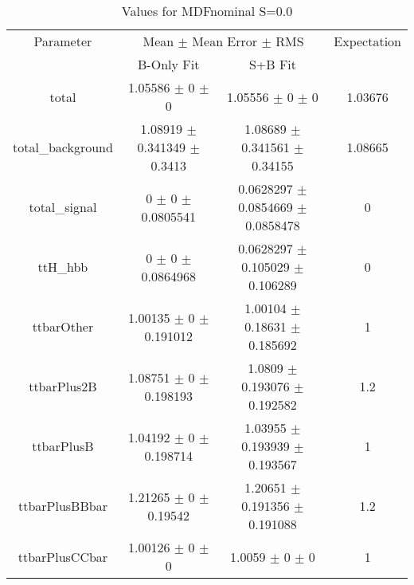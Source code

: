 \begin{table}
\centering
\caption{Values for MDFnominal S=0.0}
\begin{tabular}{cccc}
\toprule
Parameter & \multicolumn{2}{c}{Mean $\pm$ Mean Error $\pm$ RMS} & Expectation\\
 & B-Only Fit & S+B Fit & \\
\midrule
total & \num{1.05586} $\pm$ \num{0} $\pm$ \num{0} & \num{1.05556} $\pm$ \num{0} $\pm$ \num{0} & \num{1.03676}\\
total\_background & \num{1.08919} $\pm$ \num{0.341349} $\pm$ \num{0.3413} & \num{1.08689} $\pm$ \num{0.341561} $\pm$ \num{0.34155} & \num{1.08665}\\
total\_signal & \num{0} $\pm$ \num{0} $\pm$ \num{0.0805541} & \num{0.0628297} $\pm$ \num{0.0854669} $\pm$ \num{0.0858478} & \num{0}\\
ttH\_hbb & \num{0} $\pm$ \num{0} $\pm$ \num{0.0864968} & \num{0.0628297} $\pm$ \num{0.105029} $\pm$ \num{0.106289} & \num{0}\\
ttbarOther & \num{1.00135} $\pm$ \num{0} $\pm$ \num{0.191012} & \num{1.00104} $\pm$ \num{0.18631} $\pm$ \num{0.185692} & \num{1}\\
ttbarPlus2B & \num{1.08751} $\pm$ \num{0} $\pm$ \num{0.198193} & \num{1.0809} $\pm$ \num{0.193076} $\pm$ \num{0.192582} & \num{1.2}\\
ttbarPlusB & \num{1.04192} $\pm$ \num{0} $\pm$ \num{0.198714} & \num{1.03955} $\pm$ \num{0.193939} $\pm$ \num{0.193567} & \num{1}\\
ttbarPlusBBbar & \num{1.21265} $\pm$ \num{0} $\pm$ \num{0.19542} & \num{1.20651} $\pm$ \num{0.191356} $\pm$ \num{0.191088} & \num{1.2}\\
ttbarPlusCCbar & \num{1.00126} $\pm$ \num{0} $\pm$ \num{0} & \num{1.0059} $\pm$ \num{0} $\pm$ \num{0} & \num{1}\\
\bottomrule
\end{tabular}
\end{table}